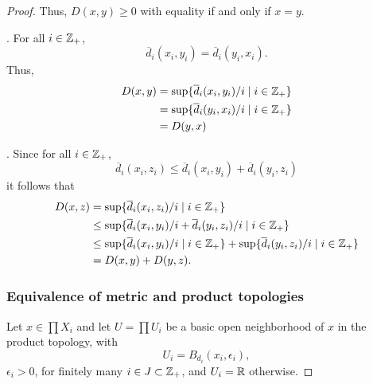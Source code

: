 \begin{solution}
\begin{proof}
    Thus, $D(x, y) \geq 0$ with equality if and only if $x = y$.
    \bigskip

    . For all $i \in \mathbb{Z}_+$,
    \begin{equation*}
      \overline{d}_i(x_i, y_i) = \overline{d}_i(y_i, x_i).
    \end{equation*}
    Thus,
    \begin{align*}
      D(x, y) &= \sup\{\overline{d}_i(x_i, y_i) / i \mid i \in \mathbb{Z}_+\} \\
              &= \sup\{\overline{d}_i(y_i, x_i) / i \mid i \in \mathbb{Z}_+\} \\
              &= D(y, x)
    \end{align*}
    \bigskip

    . Since for all $i \in \mathbb{Z}_+$,
    \begin{equation*}
      \overline{d}_i(x_i, z_i) \leq \overline{d}_i(x_i, y_i) + \overline{d}_i(y_i, z_i)
    \end{equation*}
    it follows that
    \begin{align*}
      D(x, z) &= \sup\{\overline{d}_i(x_i, z_i) / i \mid i \in \mathbb{Z}_+\} \\
              &\leq \sup\{\overline{d}_i(x_i, y_i) / i + \overline{d}_i(y_i, z_i) / i \mid i \in \mathbb{Z}_+\} \\
              &\leq \sup\{\overline{d}_i(x_i, y_i) / i \mid i \in \mathbb{Z}_+\} + \sup\{\overline{d}_i(y_i, z_i) / i \mid i \in \mathbb{Z}_+\} \\
              &= D(x, y) + D(y, z).
    \end{align*}

    \subsubsection*{Equivalence of metric and product topologies}
    Let $x \in \prod X_i$ and let $U = \prod U_i$ be a basic open neighborhood of $x$ in the product topology, with
    \begin{equation*}
      U_i = B_{d_i}(x_i, \epsilon_i),
    \end{equation*}
    $\epsilon_i > 0$, for finitely many $i \in J \subset \mathbb{Z}_+$, and $U_i = \mathbb{R}$ otherwise.


\end{proof}
\end{solution}
